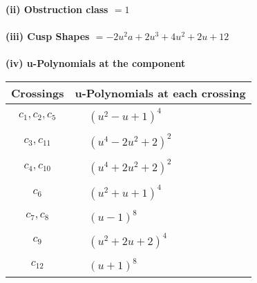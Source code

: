 \documentclass[1p]{elsarticle_modified}
\theoremstyle{definition}
\begin{document}
\flushleft \textbf{(ii) Obstruction class $= 1$}\\~\\
\flushleft \textbf{(iii) Cusp Shapes $= -2 u^2 a+2 u^3+4 u^2+2 u+12$}\\~\\
\newpage\renewcommand{\arraystretch}{1}
\flushleft \textbf{(iv) u-Polynomials at the component}\newline \\
\begin{tabular}{m{50pt}|m{274pt}}
Crossings & \hspace{64pt}u-Polynomials at each crossing \\
\hline $$\begin{aligned}c_{1},c_{2},c_{5}\end{aligned}$$&$\begin{aligned}
&(u^2- u+1)^4
\end{aligned}$\\
\hline $$\begin{aligned}c_{3},c_{11}\end{aligned}$$&$\begin{aligned}
&(u^4-2 u^2+2)^2
\end{aligned}$\\
\hline $$\begin{aligned}c_{4},c_{10}\end{aligned}$$&$\begin{aligned}
&(u^4+2 u^2+2)^2
\end{aligned}$\\
\hline $$\begin{aligned}c_{6}\end{aligned}$$&$\begin{aligned}
&(u^2+u+1)^4
\end{aligned}$\\
\hline $$\begin{aligned}c_{7},c_{8}\end{aligned}$$&$\begin{aligned}
&(u-1)^8
\end{aligned}$\\
\hline $$\begin{aligned}c_{9}\end{aligned}$$&$\begin{aligned}
&(u^2+2 u+2)^4
\end{aligned}$\\
\hline $$\begin{aligned}c_{12}\end{aligned}$$&$\begin{aligned}
&(u+1)^8
\end{aligned}$\\
\hline
\end{tabular}\\~\\
\end{document}
